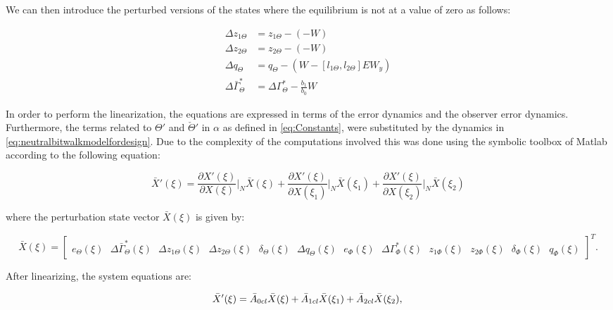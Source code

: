 \documentclass[main.tex]{subfiles}
\begin{document}
	We can then introduce the perturbed versions of the states where the equilibrium is not at a value of zero as follows:
	
	\begin{align}
		\Delta z_{1\Theta} &= z_{1\Theta} - (-W) \nonumber\\
		\Delta z_{2\Theta} &= z_{2\Theta} - (-W) \nonumber\\
		\Delta q_{\Theta} &= q_{\Theta} - (W - [l_{1\Theta}, l_{2\Theta}]E W_y ) \nonumber\\
		\Delta \bar{\Gamma}_{\Theta}^* &= \Delta \Gamma_{\Theta}^* - \frac{b_1}{b_0}W 
	\end{align}
	
	

	In order to perform the linearization, the equations are expressed in terms of the error dynamics and the observer error dynamics. Furthermore, the terms related to $\Theta'$ and $\check{\Theta}'$ in $\alpha$ as defined in \eqref{eq:Constants}, were substituted by the dynamics in \eqref{eq:neutralbitwalkmodelfordesign}. Due to the complexity of the computations involved this was done using the symbolic toolbox of Matlab according to the following equation:
	
			\begin{equation}
			\bar{X}'(\xi) =	\frac{\partial X'(\xi)}{\partial X(\xi)} \bigg|_N \bar{X}(\xi)
							+ \frac{\partial X'(\xi)}{\partial X(\xi_1)} \bigg|_N \bar{X}(\xi_1) + \frac{\partial X'(\xi)}{\partial X(\xi_2)} \bigg|_N \bar{X}(\xi_2)
			\label{eq:linearization}
			\end{equation}	
	
	
	where the perturbation state vector $\bar{X}(\xi)$ is given by:
	
	\begin{equation}
	\bar{X}(\xi) = \begin{bmatrix} 
	e_{\Theta}(\xi) \text{ }\Delta \bar{\Gamma}_\Theta^{*}(\xi) \text{ }\Delta z_{1\Theta}(\xi) \text{ }\Delta z_{2\Theta}(\xi) \text{ }\delta_{\Theta}(\xi) \text{ }\Delta q_\Theta(\xi) \text{ }e_{\Phi}(\xi) \text{ }\Delta \Gamma_\Phi^*(\xi) \text{ }z_{1\Phi}(\xi) \text{ }z_{2\Phi}(\xi) \text{ }\delta_{\Phi}(\xi) \text{ }q_\Phi(\xi)  \nonumber
	\end{bmatrix}^T.
	\end{equation}
	
	After linearizing, the system equations are:
		
	\begin{equation}
	\bar{X}'(\xi) =	\bar{A}_{0cl}\bar{X}(\xi) + \bar{A}_{1cl}\bar{X}(\xi_1) + \bar{A}_{2cl} \bar{X}(\xi_2),\\
	\label{eq:totaldynamicslinears}
	\end{equation}	
	
\end{document}
